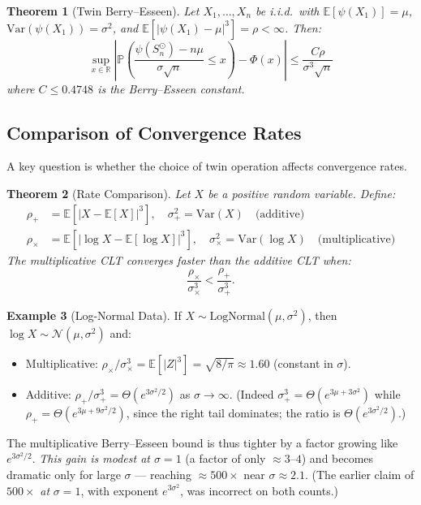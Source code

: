 \documentclass[11pt,twoside,openright]{book}
\theoremstyle{plain}
\newtheorem{theorem}{Theorem}[chapter]
\theoremstyle{definition}
\newtheorem{example}[theorem]{Example}
\theoremstyle{remark}
\newcommand{\calN}{\mathcal{N}}
\newcommand{\Rd}{\mathbb{R}}
\newcommand{\E}{\mathbb{E}}
\newcommand{\Prob}{\mathbb{P}}
\newcommand{\var}{\mathrm{Var}}
\newcommand{\twin}{\odot}
\begin{document}
\begin{theorem}[Twin Berry--Esseen]
\label{thm:twin-berry-esseen}
Let $X_1, \ldots, X_n$ be i.i.d.\ with $\E[\psi(X_1)] = \mu$, $\var(\psi(X_1)) = \sigma^2$, and $\E[|\psi(X_1) - \mu|^3] = \rho < \infty$. Then:
\begin{equation}
\sup_{x \in \Rd} \left|\Prob\left(\frac{\psi(S_n^{\twin}) - n\mu}{\sigma\sqrt{n}} \leq x\right) - \Phi(x)\right| \leq \frac{C\rho}{\sigma^3\sqrt{n}}
\label{eq:twin-berry-esseen}
\end{equation}
where $C \leq 0.4748$ is the Berry--Esseen constant.
\end{theorem}

\subsection{Comparison of Convergence Rates}

A key question is whether the choice of twin operation affects convergence rates.

\begin{theorem}[Rate Comparison]
\label{thm:rate-comparison}
Let $X$ be a positive random variable. Define:
\begin{align*}
\rho_+ &= \E[|X - \E[X]|^3], \quad \sigma_+^2 = \var(X) \quad \text{(additive)}\\
\rho_\times &= \E[|\log X - \E[\log X]|^3], \quad \sigma_\times^2 = \var(\log X) \quad \text{(multiplicative)}
\end{align*}
The multiplicative CLT converges faster than the additive CLT when:
\begin{equation}
\frac{\rho_\times}{\sigma_\times^3} < \frac{\rho_+}{\sigma_+^3}.
\label{eq:rate-comparison}
\end{equation}
\end{theorem}

\begin{example}[Log-Normal Data]
If $X \sim \text{LogNormal}(\mu, \sigma^2)$, then $\log X \sim \calN(\mu, \sigma^2)$ and:
\begin{itemize}
\item Multiplicative: $\rho_\times/\sigma_\times^3 = \E[|Z|^3] = \sqrt{8/\pi} \approx 1.60$ (constant in $\sigma$).
\item Additive: $\rho_+/\sigma_+^3 = \Theta(e^{3\sigma^2/2})$ as $\sigma \to \infty$. (Indeed $\sigma_+^3=\Theta(e^{3\mu+3\sigma^2})$ while $\rho_+=\Theta(e^{3\mu+9\sigma^2/2})$, since the right tail dominates; the ratio is $\Theta(e^{3\sigma^2/2})$.)
\end{itemize}
The multiplicative Berry--Esseen bound is thus tighter by a factor growing like $e^{3\sigma^2/2}$. \emph{This gain is modest at $\sigma=1$} (a factor of only $\approx 3$--$4$) and becomes dramatic only for large $\sigma$ --- reaching $\approx 500\times$ near $\sigma\approx 2.1$. (The earlier claim of $500\times$ \emph{at} $\sigma=1$, with exponent $e^{3\sigma^2}$, was incorrect on both counts.)
\end{example}
\end{document}
